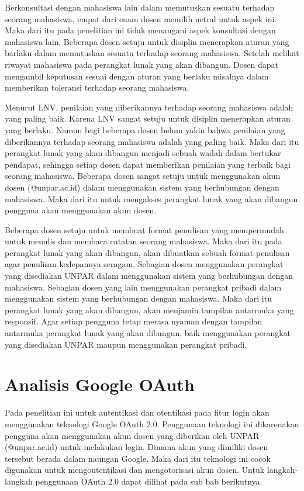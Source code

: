 Berkonsultasi dengan mahasiswa lain dalam memutuskan sesuatu terhadap seorang mahasiswa, empat dari enam dosen memilih netral untuk aspek ini. Maka dari itu pada penelitian ini tidak menangani aspek konsultasi dengan mahasiswa lain. Beberapa dosen setuju untuk disiplin menerapkan aturan yang barlaku dalam memutuskan sesuatu terhadap seorang mahasiswa. Setelah melihat riwayat mahasiswa pada perangkat lunak yang akan dibangun. Dosen dapat mengambil keputusan sesuai dengan aturan yang berlaku misalnya dalam memberikan toleransi terhadap seorang mahasiswa.

Menurut LNV, penilaian yang diberikannya terhadap seorang mahasiswa adalah yang paling baik. Karena LNV sangat setuju untuk disiplin menerapkan aturan yang berlaku. Namun bagi beberapa dosen belum yakin bahwa penilaian yang diberikannya terhadap seorang mahasiswa adalah yang paling baik. Maka dari itu perangkat lunak yang akan dibangun menjadi sebuah wadah dalam bertukar pendapat, sehingga setiap dosen dapat memberikan penilaian yang terbaik bagi seorang mahasiswa. Beberapa dosen sangat setuju untuk menggunakan akun dosen (@unpar.ac.id) dalam menggunakan sistem yang berhubungan dengan mahasiswa. Maka dari itu untuk mengakses perangkat lunak yang akan dibangun pengguna akan menggunakan akun dosen.

Beberapa dosen setuju untuk membuat format penulisan yang mempermudah untuk menulis dan membaca catatan seorang mahasiswa. Maka dari itu pada perangkat lunak yang akan dibangun, akan dibuatkan sebuah format penulisan agar penulisan kedepannya seragam. Sebagian dosen menggunakan perangkat yang disediakan UNPAR dalam menggunakan sistem yang berhubungan dengan mahasiswa. Sebagian dosen yang lain menggunakan perangkat pribadi dalam menggunakan sistem yang berhubungan dengan mahasiswa. Maka dari itu perangkat lunak yang akan dibangun, akan menjamin tampilan antarmuka yang responsif. Agar setiap pengguna tetap merasa nyaman dengan tampilan antarmuka perangkat lunak yang akan dibangun, baik menggunakan perangkat yang disediakan UNPAR maupun menggunakan perangkat pribadi.

\section{Analisis Google OAuth}
\label{sec:analisisGoogleOAuth}

Pada penelitian ini untuk autentikasi dan otentikasi pada fitur login akan menggunakan teknologi Google OAuth 2.0. Penggunaan teknologi ini dikarenakan pengguna akan menggunakan akun dosen yang diberikan oleh UNPAR (@unpar.ac.id) untuk melakukan login. Dimana akun yang dimiliki dosen tersebut berada dalam naungan Google. Maka dari itu teknologi ini cocok digunakan untuk mengoutentikasi dan mengotorisasi akun dosen. Untuk langkah-langkah penggunaan OAuth 2.0 dapat dilihat pada sub bab berikutnya.

